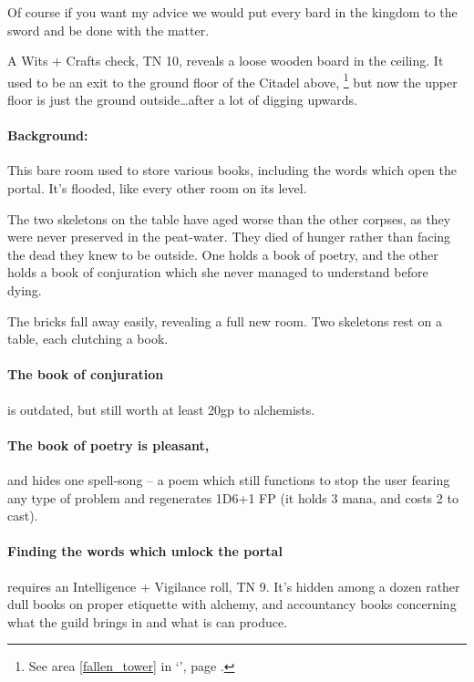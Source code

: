 \begin{multicols}{2}
\begin{exampletext}
  Of course if you want my advice we would put every bard in the kingdom to the sword and be done with the matter.

\end{exampletext}

A Wits + Crafts check, TN 10, reveals a loose wooden board in the ceiling.
It used to be an exit to the ground floor of the Citadel above,%
\footnote{See area \ref{fallen_tower} in `', page \pageref{fallen_tower}.}
but now the upper floor is just the ground outside\ldots after a lot of digging upwards.


\paragraph{Background:}
This bare room used to store various books, including the words which open the portal.
It's flooded, like every other room on its level.

The two skeletons on the table have aged worse than the other corpses, as they were never preserved in the peat-water.
They died of hunger rather than facing the dead they knew to be outside.
One holds a book of poetry, and the other holds a book of conjuration which she never managed to understand before dying.

\begin{boxtext}

  The bricks fall away easily, revealing a full new room.  Two skeletons rest on a table, each clutching a book.

\end{boxtext}

\paragraph{The book of conjuration}
is outdated, but still worth at least 20gp to \gls{alchemists}.

\paragraph{The book of poetry is pleasant,}
and hides one spell-song -- a poem which still functions to stop the user fearing any type of problem and regenerates 1D6+1 FP (it holds 3 mana, and costs 2 to cast).

\paragraph{Finding the words which unlock the portal}
requires an Intelligence + Vigilance roll, TN 9.
It's hidden among a dozen rather dull books on proper etiquette with alchemy, and accountancy books concerning what the guild brings in and what is can produce.


\end{multicols}
